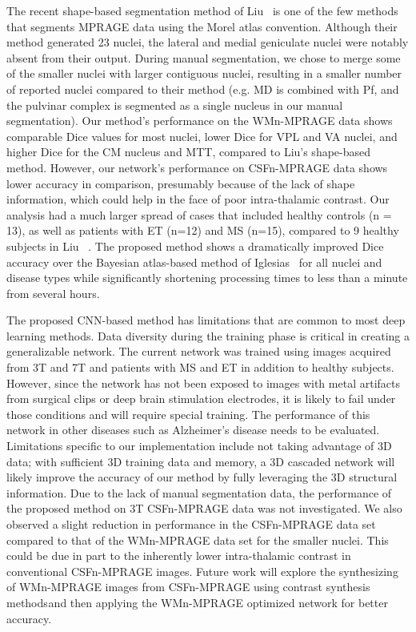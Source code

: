\documentclass[3p,,final,12pt]{elsarticle}
\begin{document}
The recent shape-based segmentation method of Liu\unskip~\cite{1643371:26789966} is one of the few methods that segments MPRAGE data using the Morel atlas convention. Although their method generated 23 nuclei, the lateral and medial geniculate nuclei were notably absent from their output. During manual segmentation, we chose to merge some of the smaller nuclei with larger contiguous nuclei, resulting in a smaller number of reported nuclei compared to their method (e.g. MD is combined with Pf, and the pulvinar complex is segmented as a single nucleus in our manual segmentation). Our method's performance on the WMn-MPRAGE data shows comparable Dice values for most nuclei, lower Dice for VPL and VA nuclei, and higher Dice for the CM nucleus and MTT, compared to Liu's shape-based method. However, our network's performance on CSFn-MPRAGE data shows lower accuracy in comparison, presumably because of the lack of shape information, which could help in the face of poor intra-thalamic contrast. Our analysis had a much larger spread of cases that included healthy controls (n = 13), as well as patients with ET (n=12) and MS (n=15), compared to 9 healthy subjects in Liu\unskip~\cite{1643371:26789966} . The proposed method shows a dramatically improved Dice accuracy over the Bayesian atlas-based method of Iglesias\unskip~\cite{1643371:26789917} for all nuclei and disease types while significantly shortening processing times to less than a minute from several hours.

The proposed CNN-based method has limitations that are common to most deep learning methods. Data diversity during the training phase is critical in creating a generalizable network. The current network was trained using images acquired from 3T and 7T and patients with MS and ET in addition to healthy subjects. However, since the network has not been exposed to images with metal artifacts from surgical clips or deep brain stimulation electrodes, it is likely to fail under those conditions and will require special training. The performance of this network in other diseases such as Alzheimer's disease needs to be evaluated. Limitations specific to our implementation include not taking advantage of 3D data; with sufficient 3D training data and memory, a 3D cascaded network will likely improve the accuracy of our method by fully leveraging the 3D structural information. Due to the lack of manual segmentation data, the performance of the proposed method on 3T CSFn-MPRAGE data was not investigated. We also observed a slight reduction in performance in the CSFn-MPRAGE data set compared to that of the WMn-MPRAGE data set for the smaller nuclei. This could be due in part to the inherently lower intra-thalamic contrast in conventional CSFn-MPRAGE images. Future work will explore the synthesizing of WMn-MPRAGE images from CSFn-MPRAGE using contrast synthesis methods\ensuremath{^{}}and then applying the WMn-MPRAGE optimized network for better accuracy. 
    
\end{document}
